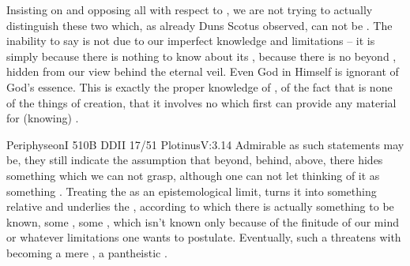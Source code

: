 Insisting on  and opposing all  with respect to , we
are not trying to actually distinguish these two  which, as already Duns
Scotus observed, can not be .
The inability to say  is not due to our imperfect
knowledge and limitations -- it is simply because there is nothing to know about
its , because there is no  beyond , 
hidden from our view behind the eternal veil.
Even God in Himself is ignorant of God's essence.
This  is exactly the proper knowledge of , of the fact
that  is none of the things of creation, that it involves no
 which first can provide any material for (knowing) 
.

\citet{He surpasses every intellect and all sensible and intelligible meanings
  Who is better known by not knowing, of Whom ignorance is the true
  knowledge.}{Periphyseon}{I 510B} \citet{But sacred ignorance teaches me that
  what seems nothing to the intellect is the incomprehensible maximum.}{DDI}{I
  17/51} \citet{We do not, it is true, grasp it by knowledge, but that does not
  mean that we are utterly void of it; we hold it not so as to state it, but so
  as to be able to speak about it. And we can and do state what it is not, while
  we are silent as to what it is [...]}{Plotinus}{V:3.14} Admirable as such
statements may be, they still indicate the assumption that beyond, behind,
above, there hides something which we can not grasp, although one can not let
thinking of it as something .  Treating the  as an
epistemological limit, turns it into something relative and underlies the
, according to which there is actually something to
be known, some , some , which isn't
known only because of the finitude of our mind or whatever limitations one wants
to postulate. Eventually, such a  threatens with becoming a mere
, a pantheistic .
  
